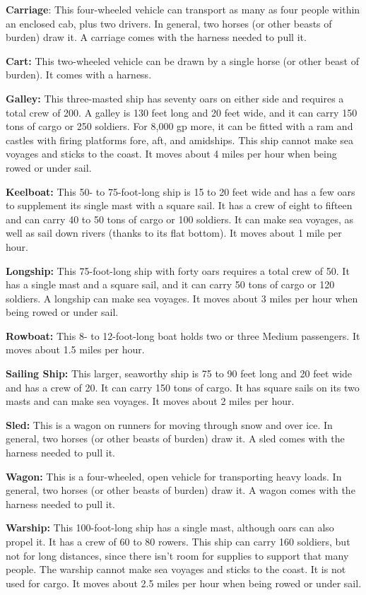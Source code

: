 \textbf{Carriage}: This four-wheeled vehicle can transport as many as four people 
within an enclosed cab, plus two drivers. In general, two horses (or other beasts 
of burden) draw it. A carriage comes with the harness needed to pull it.

\textbf{Cart:} This two-wheeled vehicle can be drawn by a single horse (or other 
beast of burden). It comes with a harness.

\textbf{Galley:} This three-masted ship has seventy oars on either side and requires 
a total crew of 200. A galley is 130 feet long and 20 feet wide, and it can carry 
150 tons of cargo or 250 soldiers. For 8,000 gp more, it can be fitted with a ram 
and castles with firing platforms fore, aft, and amidships. This ship cannot make 
sea voyages and sticks to the coast. It moves about 4 miles per hour when being 
rowed or under sail.

\textbf{Keelboat:} This 50- to 75-foot-long ship is 15 to 20 feet wide and has 
a few oars to supplement its single mast with a square sail. It has a crew of eight 
to fifteen and can carry 40 to 50 tons of cargo or 100 soldiers. It can make sea 
voyages, as well as sail down rivers (thanks to its flat bottom). It moves about 
1 mile per hour.

\textbf{Longship:} This 75-foot-long ship with forty oars requires a total crew 
of 50. It has a single mast and a square sail, and it can carry 50 tons of cargo 
or 120 soldiers. A longship can make sea voyages. It moves about 3 miles per hour 
when being rowed or under sail.

\textbf{Rowboat:} This 8- to 12-foot-long boat holds two or three Medium passengers. 
It moves about 1.5 miles per hour.

\textbf{Sailing Ship:} This larger, seaworthy ship is 75 to 90 feet long and 20 
feet wide and has a crew of 20. It can carry 150 tons of cargo. It has square sails 
on its two masts and can make sea voyages. It moves about 2 miles per hour.

\textbf{Sled:} This is a wagon on runners for moving through snow and over ice. 
In general, two horses (or other beasts of burden) draw it. A sled comes with the 
harness needed to pull it.

\textbf{Wagon:} This is a four-wheeled, open vehicle for transporting heavy loads. 
In general, two horses (or other beasts of burden) draw it. A wagon comes with 
the harness needed to pull it.

\textbf{Warship:} This 100-foot-long ship has a single mast, although oars can 
also propel it. It has a crew of 60 to 80 rowers. This ship can carry 160 soldiers, 
but not for long distances, since there isn't room for supplies to support that 
many people. The warship cannot make sea voyages and sticks to the coast. It is 
not used for cargo. It moves about 2.5 miles per hour when being rowed or under 
sail.

